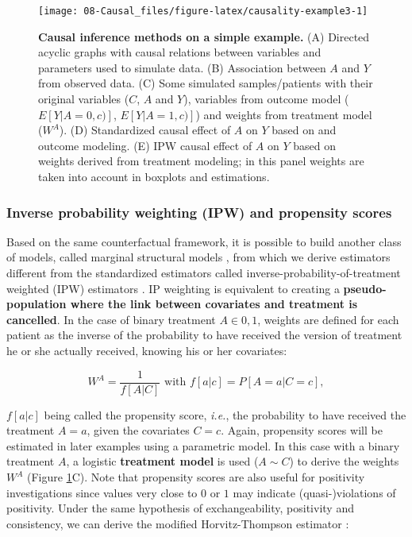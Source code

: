 \documentclass[a4paper,12pt,twoside,onecolumn,openright,final,oldfontcommands]{memoir}
\begin{document}
\begin{figure}

{\centering \texttt{[image: 08-Causal\_files/figure-latex/causality-example3-1]} 

}

\caption[Causal inference methods on a simple example]{\textbf{Causal inference methods on a
simple example.} (A) Directed acyclic graphs with causal relations
between variables and parameters used to simulate data. (B) Association
between \(A\) and \(Y\) from observed data. (C) Some simulated
samples/patients with their original variables (\(C\), \(A\) and \(Y\)),
variables from outcome model (\(E[Y|A=0,c)]\), \(E[Y|A=1,c)]\)) and
weights from treatment model (\(W^A\)). (D) Standardized causal effect
of \(A\) on \(Y\) based on and outcome modeling. (E) IPW causal effect
of \(A\) on \(Y\) based on weights derived from treatment modeling; in
this panel weights are taken into account in boxplots and estimations.}\label{fig:causality-example3}
\end{figure}












\subsubsection{Inverse probability weighting (IPW) and propensity
scores}\label{IPW-classic}

Based on the same counterfactual framework, it is possible to build
another class of models, called marginal structural models
\citep{robins2000marginal}, from which we derive estimators different
from the standardized estimators called inverse-probability-of-treatment
weighted (IPW) estimators \citep{cole2008constructing}. IP weighting is
equivalent to creating a \textbf{pseudo-population where the link
between covariates and treatment is cancelled}. In the case of binary
treatment \(A \in {0 ,1}\), weights are defined for each patient as the
inverse of the probability to have received the version of treatment he
or she actually received, knowing his or her covariates:

\[W^A=\dfrac{1}{f[A|C]} \text{ with } f[a|c]=P[A=a|C=c],\]

\(f[a|c]\) being called the propensity score, \emph{i.e.}, the
probability to have received the treatment \(A=a\), given the covariates
\(C=c\). Again, propensity scores will be estimated in later examples
using a parametric model. In this case with a binary treatment \(A\), a
logistic \textbf{treatment model} is used (\(A\sim C\)) to derive the
weights \(W^A\) (Figure \ref{fig:causality-example3}C). Note that
propensity scores are also useful for positivity investigations since
values very close to \(0\) or \(1\) may indicate (quasi-)violations of
positivity. Under the same hypothesis of exchangeability, positivity and
consistency, we can derive the modified Horvitz-Thompson estimator
\citep{horvitz1952generalization, hernan2020causal}:
\end{document}
